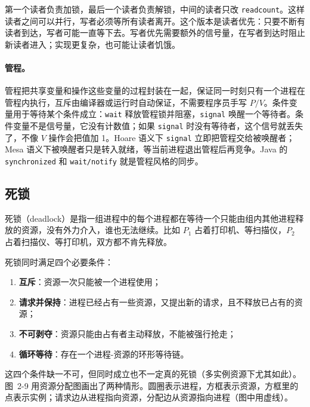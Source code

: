 第一个读者负责加锁，最后一个读者负责解锁，中间的读者只改 \texttt{readcount}。这样读者之间可以并行，写者必须等所有读者离开。这个版本是读者优先：只要不断有读者到达，写者可能一直等下去。写者优先需要额外的信号量，在写者到达时阻止新读者进入；实现更复杂，也可能让读者饥饿。

\paragraph{管程。} 管程把共享变量和操作这些变量的过程封装在一起，保证同一时刻只有一个进程在管程内执行，互斥由编译器或运行时自动保证，不需要程序员手写 $P/V$。条件变量用于等待某个条件成立：\texttt{wait} 释放管程锁并阻塞，\texttt{signal} 唤醒一个等待者。条件变量不是信号量，它没有计数值；如果 \texttt{signal} 时没有等待者，这个信号就丢失了，不像 $V$ 操作会把值加 1。Hoare 语义下 \texttt{signal} 立即把管程交给被唤醒者；Mesa 语义下被唤醒者只是转入就绪，等当前进程退出管程后再竞争。Java 的 \texttt{synchronized} 和 \texttt{wait/notify} 就是管程风格的同步。

\subsection{死锁}

死锁（deadlock）是指一组进程中的每个进程都在等待一个只能由组内其他进程释放的资源，没有外力介入，谁也无法继续。比如 $P_1$ 占着打印机、等扫描仪，$P_2$ 占着扫描仪、等打印机，双方都不肯先释放。

死锁同时满足四个必要条件：

\begin{enumerate}
  \item \textbf{互斥}：资源一次只能被一个进程使用；
  \item \textbf{请求并保持}：进程已经占有一些资源，又提出新的请求，且不释放已占有的资源；
  \item \textbf{不可剥夺}：资源只能由占有者主动释放，不能被强行抢走；
  \item \textbf{循环等待}：存在一个进程-资源的环形等待链。
\end{enumerate}

这四个条件缺一不可，但同时成立也不一定真的死锁（多实例资源下尤其如此）。图~2-9 用资源分配图画出了两种情形。圆圈表示进程，方框表示资源，方框里的点表示实例；请求边从进程指向资源，分配边从资源指向进程（图中用虚线）。

